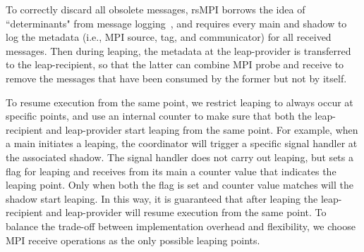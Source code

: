 To correctly discard all obsolete messages, rsMPI borrows the idea of ``determinants" from message logging~\cite{Elnozahy:02:Survey}, and requires every main and shadow to log the metadata (i.e., MPI source, tag, and communicator) for all received messages. Then during leaping, the metadata at the leap-provider is transferred to the leap-recipient, so that the latter can combine MPI probe and receive to remove the messages that have been consumed by the former but not by itself.

To resume execution from the same point, we restrict leaping to always occur at specific points, and use an internal counter to make sure that both the leap-recipient and leap-provider start leaping from the same point. For example, when a main initiates a leaping, the coordinator will trigger a specific signal handler at the associated shadow. The signal handler does not carry out leaping, but sets a flag for leaping and receives from its main a counter value that indicates the leaping point. %
Only when both the flag is set and counter value matches will the shadow start leaping. In this way, it is guaranteed that after leaping the leap-recipient and leap-provider will resume execution from the same point. To balance the trade-off between implementation overhead and flexibility, we choose MPI receive operations as the only possible leaping points. 

 





